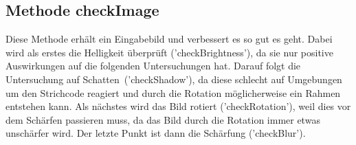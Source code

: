 \subsection*{Methode checkImage}
Diese Methode erhält ein Eingabebild und verbessert es so gut es geht.
Dabei wird als erstes die Helligkeit überprüft ('checkBrightness'), da sie nur positive Auswirkungen auf die folgenden Untersuchungen hat.
Darauf folgt die Untersuchung auf Schatten~('checkShadow'), da diese schlecht auf Umgebungen um den Strichcode reagiert und durch die Rotation möglicherweise ein Rahmen entstehen kann.
Als nächstes wird das Bild rotiert ('checkRotation'), weil dies vor dem Schärfen passieren muss, da das Bild durch die Rotation immer etwas unschärfer wird.
Der letzte Punkt ist dann die Schärfung ('checkBlur').